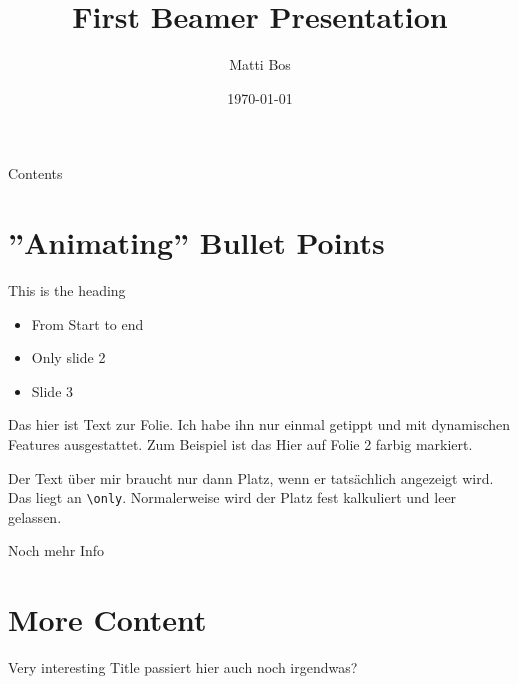 \documentclass[12pt, aspectratio=169]{beamer}
\title{First Beamer Presentation}
\author{Matti Bos}
\date{\today}
\begin{document}
\maketitle

\begin{frame}{Contents}
\tableofcontents
\end{frame}

\section{''Animating'' Bullet Points}
\begin{frame}{This is the heading}

\begin{itemize}
    \item <1-> From Start to end
    \item <2> Only slide 2
    \item <3-> Slide 3
\end{itemize}

Das hier ist Text zur Folie. Ich habe ihn nur einmal getippt und mit dynamischen Features ausgestattet. Zum Beispiel ist \alert<2>{das Hier auf Folie 2} farbig markiert.
\end{frame}

\begin{frame}[fragile]

\vspace{1em}

Der Text über mir braucht nur dann Platz, wenn er tatsächlich angezeigt wird. Das liegt an \verb|\only|. Normalerweise wird der Platz fest kalkuliert und leer gelassen.

\pause
Noch mehr Info

\end{frame}

\section{More Content}
\begin{frame}{Very interesting Title}
passiert hier auch noch irgendwas?
    

\end{frame}
\end{document}
